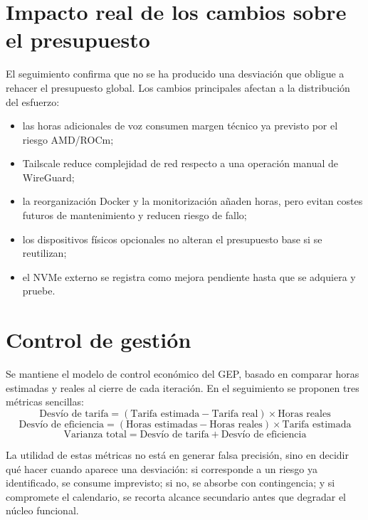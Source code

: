 \section{Impacto real de los cambios sobre el presupuesto}
El seguimiento confirma que no se ha producido una desviación que obligue a rehacer el presupuesto global. Los cambios principales afectan a la distribución del esfuerzo:
\begin{itemize}
  \item las horas adicionales de voz consumen margen técnico ya previsto por el riesgo AMD/ROCm;
  \item Tailscale reduce complejidad de red respecto a una operación manual de WireGuard;
  \item la reorganización Docker y la monitorización añaden horas, pero evitan costes futuros de mantenimiento y reducen riesgo de fallo;
  \item los dispositivos físicos opcionales no alteran el presupuesto base si se reutilizan;
  \item el NVMe externo se registra como mejora pendiente hasta que se adquiera y pruebe.
\end{itemize}

\section{Control de gestión}
Se mantiene el modelo de control económico del GEP, basado en comparar horas estimadas y reales al cierre de cada iteración. En el seguimiento se proponen tres métricas sencillas:
\[
\text{Desvío de tarifa} = (\text{Tarifa estimada} - \text{Tarifa real}) \times \text{Horas reales}
\]
\[
\text{Desvío de eficiencia} = (\text{Horas estimadas} - \text{Horas reales}) \times \text{Tarifa estimada}
\]
\[
\text{Varianza total} = \text{Desvío de tarifa} + \text{Desvío de eficiencia}
\]

La utilidad de estas métricas no está en generar falsa precisión, sino en decidir qué hacer cuando aparece una desviación: si corresponde a un riesgo ya identificado, se consume imprevisto; si no, se absorbe con contingencia; y si compromete el calendario, se recorta alcance secundario antes que degradar el núcleo funcional.
